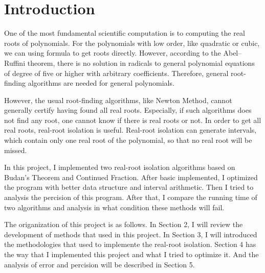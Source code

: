 \section{Introduction}

One of the most fundamental scientific computation is to computing the real
roots of polynomials. For the polynomials with low order, like quadratic or
cubic, we can using formula to get roots directly. However, according to the 
Abel–Ruffini theorem\cite{Abel-Ruffini}, there is no solution in radicals to general 
polynomial equations of degree of five or higher with arbitrary coefficients. 
Therefore, general root-finding algorithms are needed for general polynomials.

However, the usual root-finding algorithms, like Newton Method, cannot generally
certify having found all real roots. Especially, if such algorithms does not
find any root, one cannot know if there is real roots or not. In order to get
all real roots, real-root isolation is useful. Real-root isolation can generate
intervals, which contain only one real root of the polynomial, so that no real
root will be missed.

In this project, I implemented two real-root isolation algorithms based on
Budan's Theorem and Continued Fraction. After basic implemented, I optimized the
program with better data structure and interval arithmetic. Then I tried to
analysis the percision of this program. After that, I compare the running time
of two algorithms and analysis in what condition these methods will fail. 

The origanization of this project is as follows. In Section 2, I will review the
development of methods that used in this project. In Section 3, I will
introduced the methodologies that used to implemente the real-root isolation.
Section 4 has the way that I implemented this project and what I tried to
optimize it. And the analysis of error and percision will be described in
Section 5.
